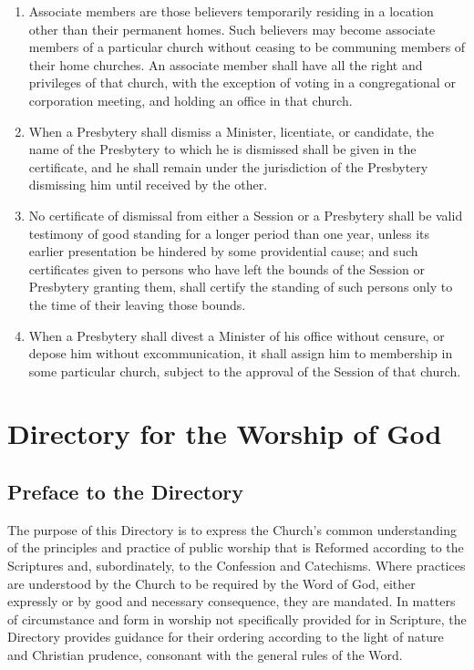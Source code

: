 \documentclass[
]{book}
\begin{document}
\begin{enumerate}
\item
  Associate members are those believers temporarily residing in a location other than their permanent homes. Such believers may become associate members of a particular church without ceasing to be communing members of their home churches. An associate member shall have all the right and privileges of that church, with the exception of voting in a congregational or corporation meeting, and holding an office in that church.
\item
  When a Presbytery shall dismiss a Minister, licentiate, or candidate, the name of the Presbytery to which he is dismissed shall be given in the certificate, and he shall remain under the jurisdiction of the Presbytery dismissing him until received by the other.
\item
  No certificate of dismissal from either a Session or a Presbytery shall be valid testimony of good standing for a longer period than one year, unless its earlier presentation be hindered by some providential cause; and such certificates given to persons who have left the bounds of the Session or Presbytery granting them, shall certify the standing of such persons only to the time of their leaving those bounds.
\item
  \protect\hypertarget{49.7}{\href{}{}}When a Presbytery shall divest a Minister of his office without censure, or depose him without excommunication, it shall assign him to membership in some particular church, subject to the approval of the Session of that church.
\end{enumerate}

\hypertarget{directory-for-the-worship-of-god}{%
\chapter*{Directory for the Worship of God}\label{directory-for-the-worship-of-god}}

\hypertarget{preface-to-the-directory}{%
\section*{Preface to the Directory}\label{preface-to-the-directory}}

\protect\hypertarget{dfw-preface}{\href{}{}}The purpose of this Directory is to express the Church's common understanding of the principles and practice of public worship that is Reformed according to the Scriptures and, subordinately, to the Confession and Catechisms. Where practices are understood by the Church to be required by the Word of God, either expressly or by good and necessary consequence, they are mandated. In matters of circumstance and form in worship not specifically provided for in Scripture, the Directory provides guidance for their ordering according to the light of nature and Christian prudence, consonant with the general rules of the Word.
\end{document}
